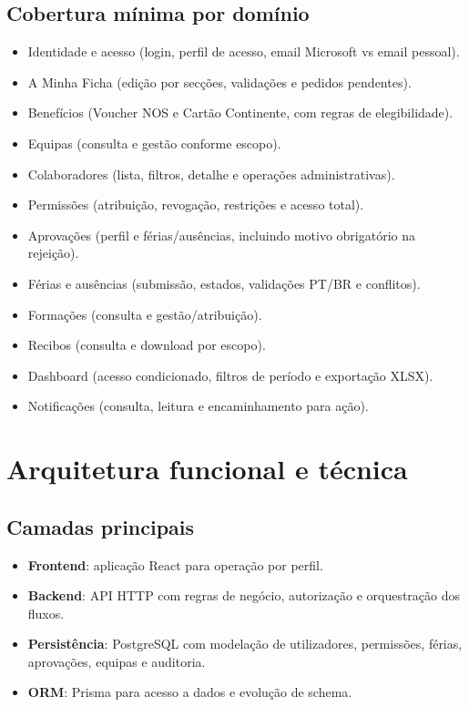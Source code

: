 \documentclass[11pt,a4paper]{article}
\begin{document}
\subsection{Cobertura mínima por domínio}
\begin{itemize}
  \item Identidade e acesso (login, perfil de acesso, email Microsoft vs email pessoal).
  \item A Minha Ficha (edição por secções, validações e pedidos pendentes).
  \item Benefícios (Voucher NOS e Cartão Continente, com regras de elegibilidade).
  \item Equipas (consulta e gestão conforme escopo).
  \item Colaboradores (lista, filtros, detalhe e operações administrativas).
  \item Permissões (atribuição, revogação, restrições e acesso total).
  \item Aprovações (perfil e férias/ausências, incluindo motivo obrigatório na rejeição).
  \item Férias e ausências (submissão, estados, validações PT/BR e conflitos).
  \item Formações (consulta e gestão/atribuição).
  \item Recibos (consulta e download por escopo).
  \item Dashboard (acesso condicionado, filtros de período e exportação XLSX).
  \item Notificações (consulta, leitura e encaminhamento para ação).
\end{itemize}

\section{Arquitetura funcional e técnica}
\subsection{Camadas principais}
\begin{itemize}
  \item \textbf{Frontend}: aplicação React para operação por perfil.
  \item \textbf{Backend}: API HTTP com regras de negócio, autorização e orquestração dos fluxos.
  \item \textbf{Persistência}: PostgreSQL com modelação de utilizadores, permissões, férias, aprovações, equipas e auditoria.
  \item \textbf{ORM}: Prisma para acesso a dados e evolução de schema.
\end{itemize}
\end{document}
